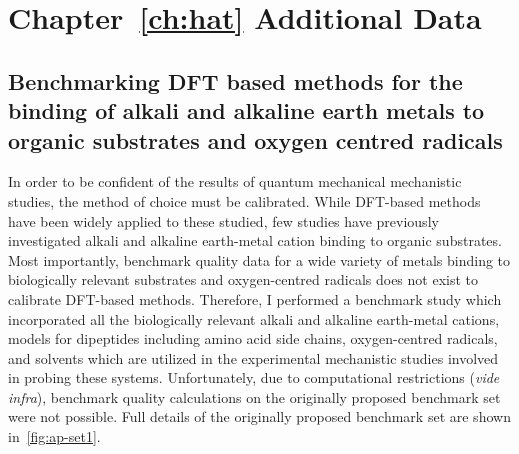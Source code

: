 \chapter{Chapter~\protect\ref{ch:hat} Additional Data}\label{ap:hat}

\begin{doublespace}

\section{Benchmarking DFT based methods for the binding of alkali and alkaline
earth metals to organic substrates and oxygen centred radicals}
\label{sec:benchmark}

In order to be confident of the results of quantum mechanical mechanistic
studies, the method of choice must be calibrated. While DFT-based methods have
been widely applied to these studied, few studies have previously investigated
alkali and alkaline earth-metal cation binding to organic
substrates.\cite{Corral2003, Suarez2011, Siu2001, Baldauf2013} Most importantly,
benchmark quality data for a wide variety of metals binding to biologically
relevant substrates and oxygen-centred radicals does not exist to calibrate
DFT-based methods. Therefore, I performed a benchmark study which incorporated
all the biologically relevant alkali and alkaline earth-metal cations, models
for dipeptides including amino acid side chains, oxygen-centred radicals, and
solvents which are utilized in the experimental mechanistic studies involved in
probing these systems. Unfortunately, due to computational restrictions
(\emph{vide infra}), benchmark quality calculations on the originally proposed
benchmark set were not possible. Full details of the originally proposed
benchmark set are shown in~\ref{fig:ap-set1}.


\end{doublespace}
